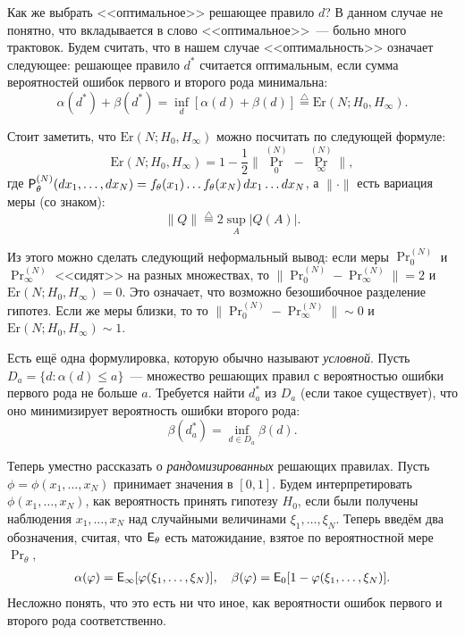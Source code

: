 Как же выбрать <<оптимальное>> решающее правило \(d\)? В данном случае не 
понятно, что вкладывается в слово <<оптимальное>>~--- больно много трактовок. 
Будем считать, что в нашем случае <<оптимальность>> означает следующее: 
решающее правило \(d^{*}\) считается оптимальным, если сумма вероятностей 
ошибок первого и второго рода минимальна:
\begin{equation}
	\alpha(d^{*}) + \beta(d^{*}) = \inf\limits_{d}[\alpha(d) + \beta(d)] 
	\overset{\bigtriangleup}{=} \mathrm{Er}(N; H_{0}, H_{\infty}).
\end{equation}

\begin{leftbar}
\begin{small}
	Стоит заметить, что \(\mathrm{Er}(N; H_{0}, H_{\infty})\) можно посчитать 
	по следующей формуле:
	\[
		\mathrm{Er}(N; H_{0}, H_{\infty}) = 1 - \frac{1}{2}\|\Pr_{0}^{(N)} - 
		\Pr_{\infty}^{(N)}\|,
	\]
	где \(\Pr_{\theta}^{(N)}(\diff x_{1}, \ldots, \diff x_{N}) = 
	f_{\theta}(x_{1}) \ldots f_{\theta}(x_{N})\diff x_{1} \ldots \diff x_{N}\), 
	а \(\| \cdot \|\) есть вариация меры (со знаком): 
	\[
		\|Q\| \overset{\bigtriangleup}{=} 2\sup_{A} |Q(A)|.
	\]
	
	Из этого можно сделать следующий неформальный вывод: если меры 
	\(\Pr_{0}^{(N)}\) и \(\Pr_{\infty}^{(N)}\) <<сидят>> на разных множествах, 
	то \(\|\Pr_{0}^{(N)} - \Pr_{\infty}^{(N)}\| = 2\) и \(\mathrm{Er}(N; H_{0}, 
	H_{\infty}) = 0\). Это означает, что возможно безошибочное разделение 
	гипотез. Если же меры близки, то то \(\|\Pr_{0}^{(N)} - 
	\Pr_{\infty}^{(N)}\| \sim 0\) и \(\mathrm{Er}(N; H_{0}, H_{\infty}) \sim 
	1\). 
\end{small}
\end{leftbar}

Есть ещё одна формулировка, которую обычно называют \emph{условной}. Пусть 
\(D_{a} = \{d: \alpha(d) \leq a\}\)~--- множество решающих правил с 
вероятностью ошибки первого рода не больше \(a\). Требуется найти \(d_{a}^{*}\) 
из \(D_{a}\) (если такое существует), что оно минимизирует вероятность ошибки 
второго рода:
\begin{equation}
	\beta(d_{a}^{*}) = \inf\limits_{d \in D_{a}} \beta(d).
\end{equation}

Теперь уместно рассказать о \emph{рандомизированных} решающих правилах. Пусть 
\(\phi = \phi(x_{1}, \ldots, x_{N})\) принимает значения в \([0, 1]\). Будем 
интерпретировать \(\phi(x_{1}, \ldots, x_{N})\), как вероятность принять 
гипотезу \(H_{0}\), если были получены наблюдения \(x_{1}, \ldots, x_{N}\) над 
случайными величинами \(\xi_{1}, \ldots, \xi_{N}\). Теперь введём два 
обозначения, считая, что \(\E_{\theta}\) есть матожидание, взятое по 
вероятностной мере 
\(\Pr_{\theta}\),
\begin{align*}
	\alpha(\phi) = \E_{\infty}[\phi(\xi_{1}, \ldots, \xi_{N})], \quad 
	\beta(\phi) = \E_{0}[1 - \phi(\xi_{1}, \ldots, \xi_{N})].
\end{align*}
Несложно понять, что это есть ни что иное, как вероятности ошибок первого и 
второго рода соответственно.

